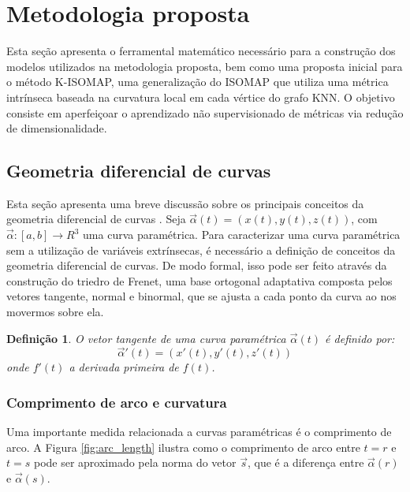 \documentclass[a4paper,12pt]{article}
\newtheorem{definition}{Definição}
\begin{document}
\section{Metodologia proposta}
\label{sc:metodologia}
\noindent
Esta seção apresenta o ferramental matemático necessário para a construção dos modelos utilizados na metodologia proposta, bem como uma proposta inicial para o método K-ISOMAP, uma generalização do ISOMAP que utiliza uma métrica intrínseca baseada na curvatura local em cada vértice do grafo KNN. O objetivo consiste em aperfeiçoar o aprendizado não supervisionado de métricas via redução de dimensionalidade.

\subsection{Geometria diferencial de curvas}

Esta seção apresenta uma breve discussão sobre os principais conceitos da geometria diferencial de curvas  \cite{ElementaryDG,FirstCourseDG,Manfredo}. Seja $\vec{\alpha}(t) = (x(t), y(t), z(t))$, com $\vec{\alpha}: [a, b] \rightarrow R^3$ uma curva paramétrica. Para caracterizar uma curva paramétrica sem a utilização de variáveis extrínsecas, é necessário a definição de conceitos da geometria diferencial de curvas. De modo formal, isso pode ser feito através da construção do triedro de Frenet, uma base ortogonal adaptativa composta pelos vetores tangente, normal e binormal, que se ajusta a cada ponto da curva ao nos movermos sobre ela. 

\begin{definition}
O vetor tangente de uma curva paramétrica $\vec{\alpha}(t)$ é definido por:
\begin{equation}
	\vec{\alpha}'(t) = \left( x'(t), y'(t), z'(t) \right)
\end{equation} onde $f'(t)$ a derivada primeira de $f(t)$.
\end{definition}

\subsubsection{Comprimento de arco e curvatura}

Uma importante medida relacionada a curvas paramétricas é o comprimento de arco. A Figura \ref{fig:arc_length} ilustra como o comprimento de arco entre $t = r$ e $t = s$ pode ser aproximado pela norma do vetor $\vec{s}$, que é a diferença entre $\vec{\alpha}(r)$ e $\vec{\alpha}(s)$.
\end{document}
